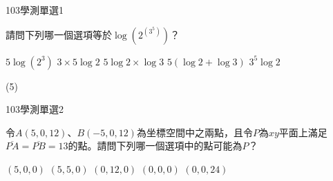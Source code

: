 \begin{QUESTIONS}
    \begin{QUESTION}
        \begin{ExamInfo}{103}{學測}{單選}{1}
        \end{ExamInfo}
        \begin{ExamAnsRateInfo}{82}{99}{93}{54}
        \end{ExamAnsRateInfo}
        \begin{QBODY}
			請問下列哪一個選項等於$\log \left( {{2}^{\left( {{3}^{5}} \right)}} \right)$？
			\begin{QOPS}
				\QOP $5\log \left( {{2}^{3}} \right)$
				\QOP $3\times 5\log 2$
				\QOP $5\log 2\times \log 3$
				\QOP $5\left( \log 2+\log 3 \right)$
				\QOP ${{3}^{5}}\log 2$
			\end{QOPS}
        \end{QBODY}
        \begin{QFROMS}
        \end{QFROMS}
        \begin{QTAGS}\end{QTAGS}
        \begin{QANS}
            (5)
        \end{QANS}
        \begin{QSOLLIST}
        \end{QSOLLIST}
        \begin{QEMPTYSPACE}
        \end{QEMPTYSPACE}
    \end{QUESTION}
    \begin{QUESTION}
        \begin{ExamInfo}{103}{學測}{單選}{2}
        \end{ExamInfo}
        \begin{ExamAnsRateInfo}{74}{95}{85}{42}
        \end{ExamAnsRateInfo}
        \begin{QBODY}
			令$A(5,0,12)$、$B(-5,0,12)$為坐標空間中之兩點，且令$P$為$xy$平面上滿足$\overline{PA}=\overline{PB}=13$的點。請問下列哪一個選項中的點可能為$P$？
			\begin{QOPS}
				\QOP $(5,0,0)$
				\QOP $(5,5,0)$
				\QOP $(0,12,0)$
				\QOP $(0,0,0)$
				\QOP $(0,0,24)$
			\end{QOPS}
        \end{QBODY}
        \begin{QFROMS}
        \end{QFROMS}

\end{QUESTION}
\end{QUESTIONS}
